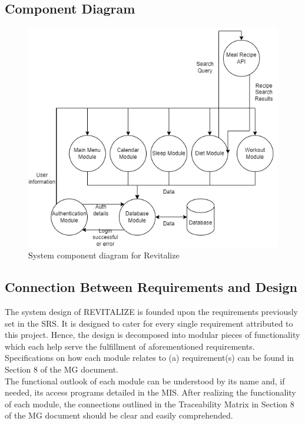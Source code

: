 \documentclass[12pt, titlepage]{article}
\begin{document}
\subsection{Component Diagram}
\begin{figure}[H]
	\centering
	\includegraphics[scale=0.7]{system_diagrams/SystemComponentDiagram.png}
	\caption{\textcolor{black} System component diagram for Revitalize}
\end{figure}
\subsection{Connection Between Requirements and Design} \label{SecConnection}

The system design of REVITALIZE is founded upon the requirements previously set in the SRS. It is designed to cater for every single requirement attributed to this project. Hence, the design is decomposed into modular pieces of functionality which each help serve the fulfillment of aforementioned requirements. Specifications on how each module relates to (a) requirement(s) can be found in Section 8 of the MG document.\\
The functional outlook of each module can be understood by its name and, if needed, its access programs detailed in the MIS. After realizing the functionality of each module, the connections outlined in the Traceability Matrix in Section 8 of the MG document should be clear and easily comprehended.
\end{document}
